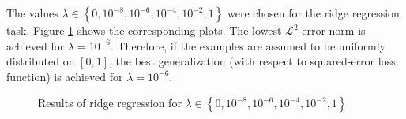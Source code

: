 The values $\lambda\in\left\{ 0,10^{-8},10^{-6},10^{-4},10^{-2},1\right\} $
were chosen for the ridge regression task. Figure \ref{fig:ridge-regression}
shows the corresponding plots. The lowest $\mathcal{L}^{2}$ error
norm is achieved for $\lambda=10^{-6}$. Therefore, if the examples are assumed to be uniformly distributed on $[0,1]$, the best generalization (with respect to squared-error loss function) is achieved for $\lambda=10^{-6}$.

\begin{figure}
\centering{}\hfill{}\hfill{}\hfill{}\caption{Results of ridge regression for $\lambda\in\left\{ 0,10^{-8},10^{-6},10^{-4},10^{-2},1\right\} $\label{fig:ridge-regression}}
\end{figure}
